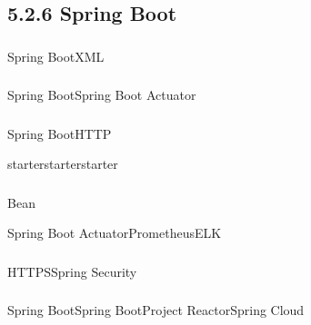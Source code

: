 \begin{enumerate}
\begin{itemize}
{    \subsection{5.2.6 Spring Boot}\label{spring-boot-3}}
  \end{itemize}
\end{enumerate}

\hypertarget{section-38}{%
\subsubsection{}\label{section-38}}

Spring Boot\important{}XML\important{}\important{}

\hypertarget{section-39}{%
\subsubsection{}\label{section-39}}

\important{}Spring BootSpring Boot Actuator

\important{}

\hypertarget{section-40}{%
\subsubsection{}\label{section-40}}

Spring Boot\important{}HTTP

starterstarterstarter

\hypertarget{section-41}{%
\subsubsection{}\label{section-41}}

\important{}Bean

\important{}Spring Boot ActuatorPrometheusELK

\hypertarget{section-42}{%
\subsubsection{}\label{section-42}}

\important{}HTTPSSpring Security

\important{}

\hypertarget{section-43}{%
\subsubsection{}\label{section-43}}

Spring BootSpring Boot\important{}Project
Reactor\important{}Spring Cloud


